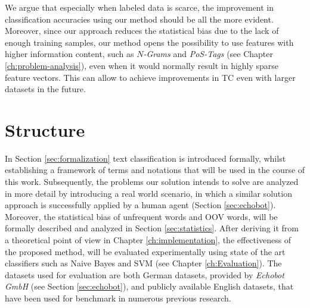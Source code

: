 We argue that especially when labeled data is scarce, the
improvement in classification accuracies using our method should be all the more evident. Moreover, since our
approach reduces the statistical bias due to the lack of enough training
samples, our method opens the possibility to use features with higher information content, such as \emph{$N$-Grams} 
and \emph{PoS-Tags} (see Chapter \ref{ch:problem-analysis}), even when it would normally result in 
highly sparse feature vectors. This can allow to achieve improvements in TC
even with larger datasets in the future.

\section{Structure}
In Section \ref{sec:formalization} text classification is introduced formally,
whilst establishing a framework of terms and notations that will be used in the course of this work. 
Subsequently, the problems our solution intends to solve are analyzed in more
detail by introducing a real world scenario, in which a similar solution approach is successfully applied by a human agent (Section \ref{sec:echobot}).
Moreover, the statistical bias of unfrequent words and OOV words, will be
formally described and analyzed in Section \ref{sec:statistics}. After deriving it from a 
theoretical point of view in Chapter \ref{ch:implementation}, the effectiveness
of the proposed method, will be evaluated experimentally using state of the art classifiers 
such as Naive Bayes and SVM (see Chapter \ref{ch:Evaluation}). The datasets used
for evaluation are both German datasets, provided by \emph{Echobot GmbH} (see Section \ref{sec:echobot}), 
and publicly available English datasets, that have been used for benchmark in numerous previous research. 
 